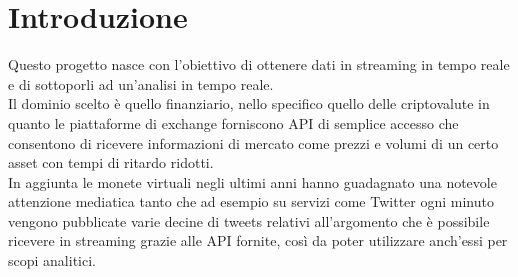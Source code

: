 \section{Introduzione}

Questo progetto nasce con l'obiettivo di ottenere dati in streaming in tempo reale e di sottoporli
ad un'analisi
in tempo reale.\\
Il dominio scelto è quello finanziario, nello specifico quello delle criptovalute in
quanto le piattaforme di exchange forniscono API di semplice accesso che consentono di ricevere
informazioni di mercato come prezzi e volumi di un certo asset con tempi di ritardo ridotti.\\
In aggiunta le monete virtuali negli ultimi anni hanno guadagnato una notevole attenzione mediatica
tanto che ad esempio su servizi come Twitter ogni minuto vengono pubblicate varie decine di tweets
relativi all'argomento che è possibile ricevere in streaming grazie alle API fornite, così da poter utilizzare anch'essi per scopi analitici.